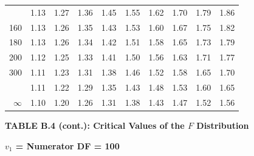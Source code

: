 \documentclass[10pt]{article}
\begin{document}
\begin{longtable}{@{}r!{\vrule width 0.8pt\hspace{0.55em}}rrrrrrrrr@{}}
 & 1.13 & 1.27 & 1.36 & 1.45 & 1.55 & 1.62 & 1.70 & 1.79 & 1.86 \\
160 & 1.13 & 1.26 & 1.35 & 1.43 & 1.53 & 1.60 & 1.67 & 1.75 & 1.82 \\
180 & 1.13 & 1.26 & 1.34 & 1.42 & 1.51 & 1.58 & 1.65 & 1.73 & 1.79 \\
200 & 1.12 & 1.25 & 1.33 & 1.41 & 1.50 & 1.56 & 1.63 & 1.71 & 1.77 \\
300 & 1.11 & 1.23 & 1.31 & 1.38 & 1.46 & 1.52 & 1.58 & 1.65 & 1.70 \\
 & 1.11 & 1.22 & 1.29 & 1.35 & 1.43 & 1.48 & 1.53 & 1.60 & 1.65 \\
$\infty$ & 1.10 & 1.20 & 1.26 & 1.31 & 1.38 & 1.43 & 1.47 & 1.52 & 1.56 \\
\end{longtable}
\newpage
\thispagestyle{empty}
\begin{center}
{\large\bfseries TABLE B.4 (cont.): Critical Values of the $F$ Distribution\par}
\end{center}
{\large\bfseries $v_1$ = Numerator DF = 100\par}
\vspace{0.5em}
\small
\end{document}
